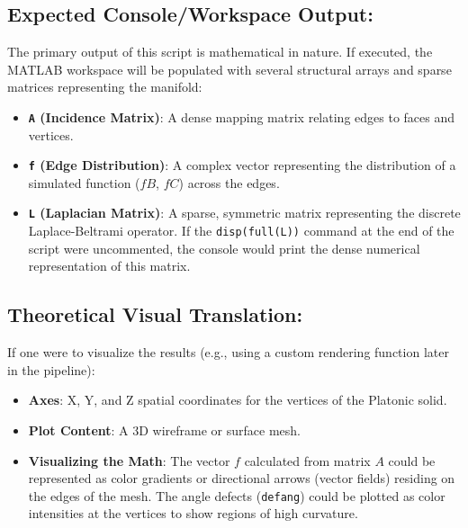 \subsection*{Expected Console/Workspace Output:}
The primary output of this script is mathematical in nature. If executed, the MATLAB workspace will be populated with several structural arrays and sparse matrices representing the manifold:
\begin{itemize}
    \item \textbf{\texttt{A} (Incidence Matrix)}: A dense mapping matrix relating edges to faces and vertices.
    \item \textbf{\texttt{f} (Edge Distribution)}: A complex vector representing the distribution of a simulated function ($fB$, $fC$) across the edges.
    \item \textbf{\texttt{L} (Laplacian Matrix)}: A sparse, symmetric matrix representing the discrete Laplace-Beltrami operator. If the \texttt{disp(full(L))} command at the end of the script were uncommented, the console would print the dense numerical representation of this matrix.
\end{itemize}

\subsection*{Theoretical Visual Translation:}
If one were to visualize the results (e.g., using a custom rendering function later in the pipeline):
\begin{itemize}
    \item \textbf{Axes}: X, Y, and Z spatial coordinates for the vertices of the Platonic solid.
    \item \textbf{Plot Content}: A 3D wireframe or surface mesh.
    \item \textbf{Visualizing the Math}: The vector $f$ calculated from matrix $A$ could be represented as color gradients or directional arrows (vector fields) residing on the edges of the mesh. The angle defects (\texttt{defang}) could be plotted as color intensities at the vertices to show regions of high curvature.
\end{itemize}